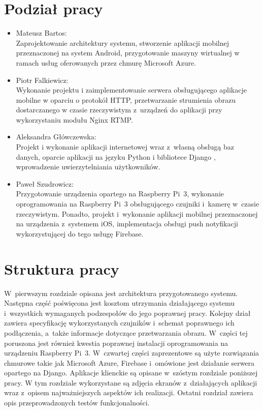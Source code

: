 \documentclass[polish,bachelor,a4paper,oneside]{ppfcmthesis}
\begin{document}
    \section{Podział pracy}
    \begin{itemize}
        \item Mateusz Bartos: \\
        Zaprojektowanie architektury systemu, stworzenie aplikacji mobilnej przeznaczonej na system Android, przygotowanie maszyny wirtualnej w ramach usług oferowanych przez chmurę Microsoft Azure.
        \item Piotr Falkiewicz: \\
        Wykonanie projektu i zaimplementowanie serwera obsługującego aplikacje mobilne w oparciu o protokół HTTP, przetwarzanie strumienia obrazu dostarczanego w czasie rzeczywistym z~urządzeń do aplikacji przy wykorzystaniu modułu Nginx RTMP.
        \item Aleksandra Główczewska: \\
        Projekt i wykonanie aplikacji internetowej wraz z~własną obsługą baz danych, oparcie aplikacji na języku Python i bibliotece Django \cite{djangoREST}, wprowadzenie uwierzytelniania użytkowników.
        \item Paweł Szudrowicz: \\
        Przygotowanie urządzenia opartego na Raspberry Pi~3, wykonanie oprogramowania na Raspberry Pi~3 obsługującego czujniki i~kamerę w~czasie rzeczywistym. Ponadto, projekt i~wykonanie aplikacji mobilnej przeznaczonej na urządzenia z~systemem iOS, implementacja obsługi push notyfikacji wykorzystującej do tego usługę Firebase.
    \end{itemize}

    \section{Struktura pracy}
    W~pierwszym rozdziale opisana jest architektura przygotowanego systemu. Następna część poświęcona jest kosztom utrzymania działającego systemu i~wszystkich wymaganych podzespołów do jego poprawnej pracy. Kolejny dział zawiera specyfikację wykorzystanych czujników i~schemat poprawnego ich podłączenia, a~także informacje dotyczące przetwarzania obrazu. W~części tej poruszona jest również kwestia poprawnej instalacji oprogramowania na urządzeniu Raspberry Pi~3.  W~czwartej części zaprezentowe są użyte rozwiązania chmurowe takie jak Microsoft Azure, Firebase i~omówione jest działanie serwera opartego na Django. Aplikacje klienckie są opisane w~szóstym rozdziale poniższej pracy. W tym rozdziale wykorzystane są zdjęcia ekranów z~działających aplikacji wraz z~opisem najważniejszych aspektów ich realizacji. Ostatni rozdział zawiera opis przeprowadzonych testów funkcjonalności.
\end{document}

